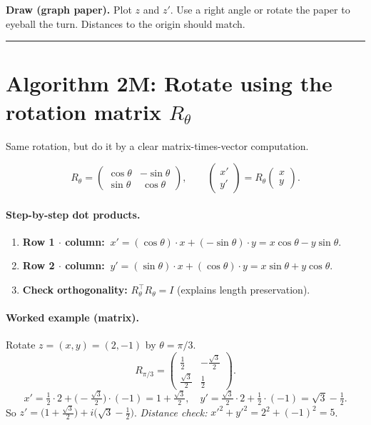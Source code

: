\documentclass[11pt]{article}
\begin{document}
\medskip
\noindent\textbf{Draw (graph paper).} Plot \(z\) and \(z'\). Use a right angle or rotate the paper to eyeball the turn. Distances to the origin should match.

\bigskip
\hrule
\bigskip

\section*{Algorithm 2M: Rotate using the rotation matrix \(R_\theta\)}
Same rotation, but do it by a clear matrix-times-vector computation.

\[
R_\theta=
\begin{pmatrix}
\cos\theta & -\sin\theta\\
\sin\theta & \ \cos\theta
\end{pmatrix},\qquad
\begin{pmatrix}x'\\y'\end{pmatrix}
=R_\theta\begin{pmatrix}x\\y\end{pmatrix}.
\]

\paragraph{Step-by-step dot products.}
\begin{enumerate}[label=\textbf{Step \arabic*.}]
  \item \textbf{Row 1 \(\cdot\) column:}
  \(\ x'=(\cos\theta)\cdot x + (-\sin\theta)\cdot y = x\cos\theta - y\sin\theta\).
  \item \textbf{Row 2 \(\cdot\) column:}
  \(\ y'=(\sin\theta)\cdot x + (\cos\theta)\cdot y = x\sin\theta + y\cos\theta\).
  \item \textbf{Check orthogonality:} \(R_\theta^\top R_\theta=I\) (explains length preservation).
\end{enumerate}

\paragraph{Worked example (matrix).}
Rotate \(z=(x,y)=(2,-1)\) by \(\theta=\pi/3\).
\[
R_{\pi/3}=\begin{pmatrix}\tfrac12 & -\tfrac{\sqrt3}{2}\\[2pt] \tfrac{\sqrt3}{2} & \tfrac12\end{pmatrix}.
\]
\[
x'=\tfrac12\cdot 2 + \Big(-\tfrac{\sqrt3}{2}\Big)\cdot(-1)=1+\tfrac{\sqrt3}{2},\quad
y'=\tfrac{\sqrt3}{2}\cdot 2 + \tfrac12\cdot(-1)=\sqrt3-\tfrac12.
\]
So \(z'=\bigl(1+\tfrac{\sqrt3}{2}\bigr)+i\bigl(\sqrt3-\tfrac12\bigr)\).
\emph{Distance check:} \({x'}^2+{y'}^2=2^2+(-1)^2=5\).
\end{document}
